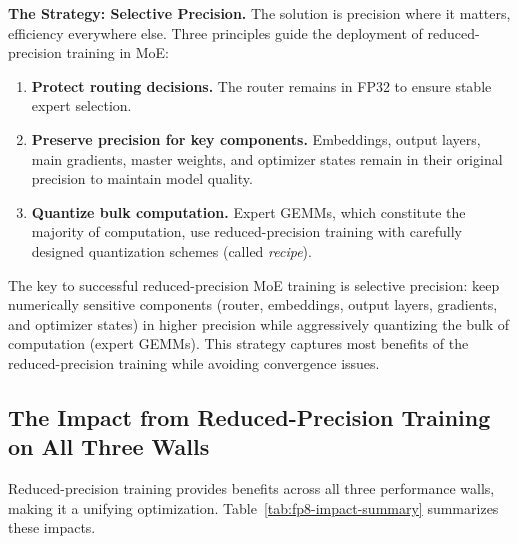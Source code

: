 \documentclass[10pt,logo,copyright]{nvidiatechreport}
\begin{document}
\textbf{The Strategy: Selective Precision.} The solution is precision where it matters, efficiency everywhere else. Three principles guide the deployment of reduced-precision training in MoE:
\begin{enumerate}
    \item \textbf{Protect routing decisions.} The router remains in FP32 to ensure stable expert selection.
    \item \textbf{Preserve precision for key components.} Embeddings, output layers, main gradients, master weights, and optimizer states remain in their original precision to maintain model quality.
    \item \textbf{Quantize bulk computation.} Expert GEMMs, which constitute the majority of computation, use reduced-precision training with carefully designed quantization schemes (called \textit{recipe}).
\end{enumerate}

\begin{notebox}
The key to successful reduced-precision MoE training is selective precision: keep numerically sensitive components (router, embeddings, output layers, gradients, and optimizer states) in higher precision while aggressively quantizing the bulk of computation (expert GEMMs). This strategy captures most benefits of the reduced-precision training while avoiding convergence issues.
\end{notebox}

\subsection{The Impact from Reduced-Precision Training on All Three Walls}

Reduced-precision training provides benefits across all three performance walls, making it a unifying optimization. Table~\ref{tab:fp8-impact-summary} summarizes these impacts.
\end{document}
